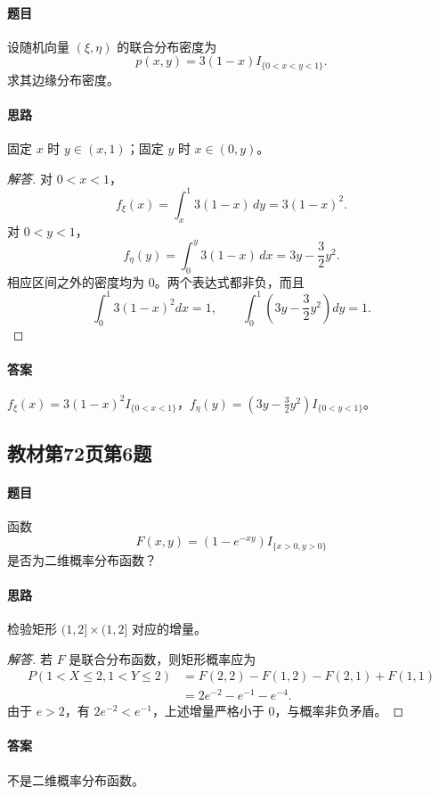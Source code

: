 \paragraph{题目}
设随机向量 $(\xi,\eta)$ 的联合分布密度为
\[
p(x,y)=3(1-x)I_{\{0<x<y<1\}}.
\]
求其边缘分布密度。
\paragraph{思路}固定 $x$ 时 $y\in(x,1)$；固定 $y$ 时 $x\in(0,y)$。
\begin{proof}[解答]
对 $0<x<1$，
\[
f_\xi(x)=\int_x^1 3(1-x)\,dy=3(1-x)^2.
\]
对 $0<y<1$，
\[
f_\eta(y)=\int_0^y3(1-x)\,dx=3y-\frac32y^2.
\]
相应区间之外的密度均为 $0$。两个表达式都非负，而且
\[
\int_0^1 3(1-x)^2dx=1,\qquad
\int_0^1\left(3y-\frac32y^2\right)dy=1.
\]
\end{proof}
\paragraph{答案}$f_\xi(x)=3(1-x)^2I_{\{0<x<1\}}$，$f_\eta(y)=(3y-\frac32y^2)I_{\{0<y<1\}}$。

\subsection{教材第72页第6题}\label{ex:w10-b72-6}
\paragraph{题目}
函数
\[
F(x,y)=(1-e^{-xy})I_{\{x>0,y>0\}}
\]
是否为二维概率分布函数？
\paragraph{思路}检验矩形 $(1,2]\times(1,2]$ 对应的增量。
\begin{proof}[解答]
若 $F$ 是联合分布函数，则矩形概率应为
\begin{align*}
P(1<X\leq2,1<Y\leq2)
&=F(2,2)-F(1,2)-F(2,1)+F(1,1)\\
&=2e^{-2}-e^{-1}-e^{-4}.
\end{align*}
由于 $e>2$，有 $2e^{-2}<e^{-1}$，上述增量严格小于 $0$，与概率非负矛盾。
\end{proof}
\paragraph{答案}不是二维概率分布函数。

